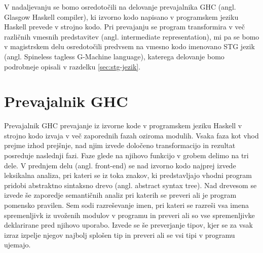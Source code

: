V nadaljevanju se bomo osredotočili na delovanje prevajalnika GHC (angl. Glasgow Haskell compiler), ki izvorno kodo napisano v programskem jeziku Haskell prevede v strojno kodo. Pri prevajanju se program transformira v več različnih vmesnih predstavitev (angl. intermediate representation), mi pa se bomo v magistrskem delu osredotočili predvsem na vmesno kodo imenovano STG jezik (angl. Spineless tagless G-Machine language), katerega delovanje bomo podrobneje opisali v razdelku \ref{sec:stg-jezik}.


\section{Prevajalnik GHC}
\label{sec:prevajalnik-ghc}

Prevajalnik GHC prevajanje iz izvorne kode v programskem jeziku Haskell v strojno kodo izvaja v več zaporednih fazah oziroma modulih. Vsaka faza kot vhod prejme izhod prejšnje, nad njim izvede določeno transformacijo in rezultat posreduje naslednji fazi. Faze glede na njihovo funkcijo v grobem delimo na tri dele. V prednjem delu (angl. front-end) se nad izvorno kodo najprej izvede leksikalna analiza, pri kateri se iz toka znakov, ki predstavljajo vhodni program pridobi abstraktno sintaksno drevo (angl. abstract syntax tree). Nad drevesom se izvede še zaporedje semantičnih analiz pri katerih se preveri ali je program pomensko pravilen. Sem sodi razreševanje imen, pri kateri se razreši vsa imena spremenljivk iz uvoženih modulov v programu in preveri ali so vse spremenljivke deklarirane pred njihovo uporabo. Izvede se še preverjanje tipov, kjer se za vsak izraz izpelje njegov najbolj splošen tip in preveri ali se vsi tipi v programu ujemajo.

